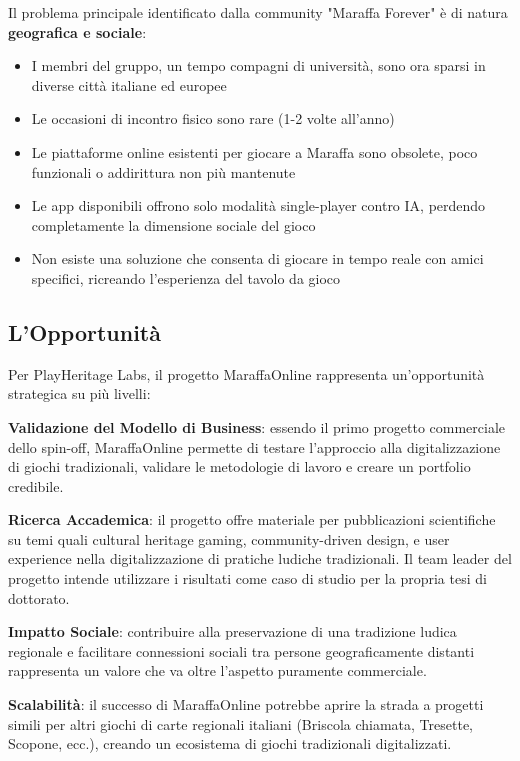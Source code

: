 Il problema principale identificato dalla community "Maraffa Forever" è di natura \textbf{geografica e sociale}:
\begin{itemize}
    \item I membri del gruppo, un tempo compagni di università, sono ora sparsi in diverse città italiane ed europee
    \item Le occasioni di incontro fisico sono rare (1-2 volte all'anno)
    \item Le piattaforme online esistenti per giocare a Maraffa sono obsolete, poco funzionali o addirittura non più mantenute
    \item Le app disponibili offrono solo modalità single-player contro IA, perdendo completamente la dimensione sociale del gioco
    \item Non esiste una soluzione che consenta di giocare in tempo reale con amici specifici, ricreando l'esperienza del tavolo da gioco
\end{itemize}

\subsection{L'Opportunità}

Per PlayHeritage Labs, il progetto MaraffaOnline rappresenta un'opportunità strategica su più livelli:

\textbf{Validazione del Modello di Business}: essendo il primo progetto commerciale dello spin-off, MaraffaOnline permette di testare l'approccio alla digitalizzazione di giochi tradizionali, validare le metodologie di lavoro e creare un portfolio credibile.

\textbf{Ricerca Accademica}: il progetto offre materiale per pubblicazioni scientifiche su temi quali cultural heritage gaming, community-driven design, e user experience nella digitalizzazione di pratiche ludiche tradizionali. Il team leader del progetto intende utilizzare i risultati come caso di studio per la propria tesi di dottorato.

\textbf{Impatto Sociale}: contribuire alla preservazione di una tradizione ludica regionale e facilitare connessioni sociali tra persone geograficamente distanti rappresenta un valore che va oltre l'aspetto puramente commerciale.

\textbf{Scalabilità}: il successo di MaraffaOnline potrebbe aprire la strada a progetti simili per altri giochi di carte regionali italiani (Briscola chiamata, Tresette, Scopone, ecc.), creando un ecosistema di giochi tradizionali digitalizzati.

